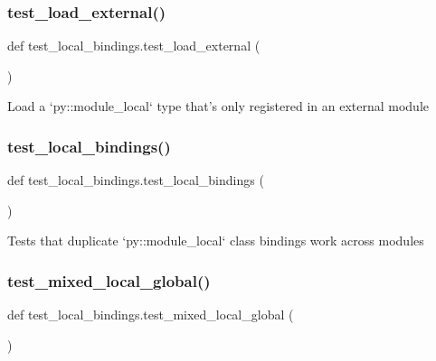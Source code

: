 \subsubsection{\texorpdfstring{test\_load\_external()}{test\_load\_external()}}
{\footnotesize\ttfamily def test\+\_\+local\+\_\+bindings.\+test\+\_\+load\+\_\+external (\begin{DoxyParamCaption}{ }\end{DoxyParamCaption})}

\begin{DoxyVerb}Load a `py::module_local` type that's only registered in an external module\end{DoxyVerb}
 \mbox{\label{namespacetest__local__bindings_a4049ee495a07c69bf03d37d6d77259d1}} 
\subsubsection{\texorpdfstring{test\_local\_bindings()}{test\_local\_bindings()}}
{\footnotesize\ttfamily def test\+\_\+local\+\_\+bindings.\+test\+\_\+local\+\_\+bindings (\begin{DoxyParamCaption}{ }\end{DoxyParamCaption})}

\begin{DoxyVerb}Tests that duplicate `py::module_local` class bindings work across modules\end{DoxyVerb}
 \mbox{\label{namespacetest__local__bindings_a23ac750737cd60717eac38fa84b0e2c2}} 
\subsubsection{\texorpdfstring{test\_mixed\_local\_global()}{test\_mixed\_local\_global()}}
{\footnotesize\ttfamily def test\+\_\+local\+\_\+bindings.\+test\+\_\+mixed\+\_\+local\+\_\+global (\begin{DoxyParamCaption}{ }\end{DoxyParamCaption})}


